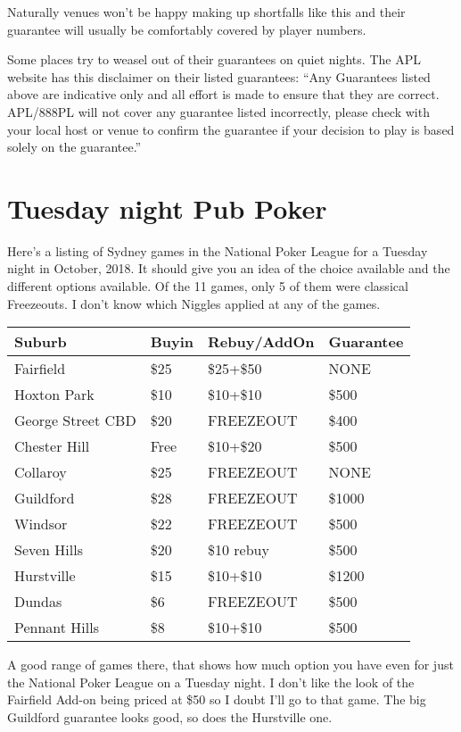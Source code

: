 Naturally venues won't be happy making up shortfalls like this and
their guarantee will usually be comfortably covered by player numbers.

Some places try to weasel out of their guarantees on quiet nights.
The APL website has this disclaimer on their listed guarantees:
``Any Guarantees listed above are indicative only and all effort
is made to ensure that they are correct. APL/888PL will not cover
any guarantee listed incorrectly, please check with your local
host or venue to confirm the guarantee if your decision to
play is based solely on the guarantee.''

\section{Tuesday night Pub Poker}

Here's a listing of Sydney games in the National Poker League
for a Tuesday night in October, 2018. It should give you an
idea of the choice available and the different options available.
Of the 11 games, only 5 of them were classical Freezeouts.
I don't know which Niggles applied at any of the games.


\begin{tabular}{|l|l|l|l|} \hline
Suburb & Buyin & Rebuy/AddOn & Guarantee \\ \hline
Fairfield        & \$25 & \$25+\$50 & NONE \\ \hline
Hoxton Park       & \$10 & \$10+\$10 & \$500 \\ \hline
George Street CBD & \$20 & FREEZEOUT & \$400 \\ \hline
Chester Hill & Free & \$10+\$20 & \$500 \\ \hline
Collaroy & \$25 & FREEZEOUT & NONE \\ \hline
Guildford & \$28 & FREEZEOUT & \$1000 \\ \hline
Windsor & \$22 & FREEZEOUT & \$500 \\ \hline
Seven Hills & \$20 & \$10 rebuy & \$500 \\ \hline
Hurstville & \$15 & \$10+\$10 & \$1200 \\ \hline
Dundas & \$6 & FREEZEOUT & \$500 \\ \hline
Pennant Hills & \$8 & \$10+\$10 & \$500 \\ \hline
\end{tabular}

A good range of games there, that shows how much option you
have even for just the National Poker League on a Tuesday night.
I don't like the look of the Fairfield Add-on being priced at \$50
so I doubt I'll go to that game. The big Guildford guarantee looks
good, so does the Hurstville one.

